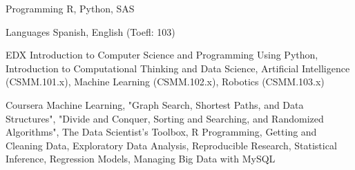 

\begin{cvskills}




  \cvskill
    {Programming} %
    {R, Python, SAS} %

  \cvskill
    {Languages} %
    {Spanish, English (Toefl: 103)} %

  \cvskill
    {EDX} %
    {Introduction to Computer Science and Programming Using Python, Introduction to Computational Thinking and Data Science, Artificial Intelligence (CSMM.101.x), Machine Learning (CSMM.102.x), Robotics (CSMM.103.x)} %

  \cvskill
    {Coursera} %
    {Machine Learning, "Graph Search, Shortest Paths, and Data Structures", "Divide and Conquer, Sorting and Searching, and Randomized Algorithms", The Data Scientist's Toolbox, R Programming, Getting and Cleaning Data, Exploratory Data Analysis, Reproducible Research, Statistical Inference, Regression Models, Managing Big Data with MySQL} %
    
\end{cvskills}
